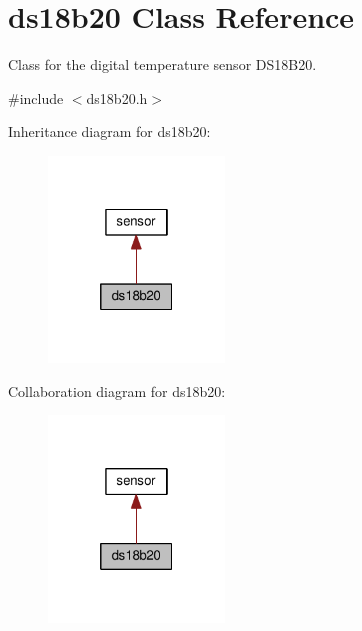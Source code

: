 \hypertarget{classds18b20}{}\section{ds18b20 Class Reference}
\label{classds18b20}


Class for the digital temperature sensor D\+S18\+B20.  




{\ttfamily \#include $<$ds18b20.\+h$>$}



Inheritance diagram for ds18b20\+:\nopagebreak
\begin{figure}[H]
\begin{center}
\leavevmode
\includegraphics[width=133pt]{classds18b20__inherit__graph}
\end{center}
\end{figure}


Collaboration diagram for ds18b20\+:\nopagebreak
\begin{figure}[H]
\begin{center}
\leavevmode
\includegraphics[width=133pt]{classds18b20__coll__graph}
\end{center}
\end{figure}
